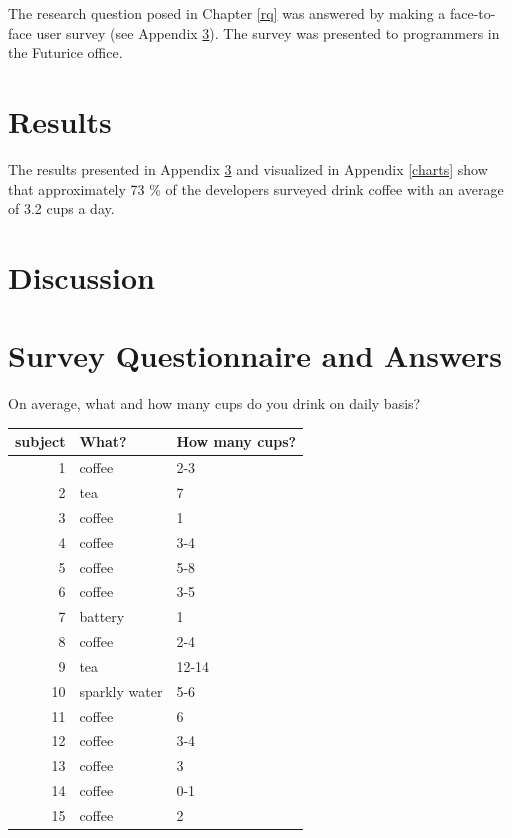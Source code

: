 \documentclass[a4paper,12pt]{article}
\begin{document}
The research question posed in Chapter \ref{rq} was answered by making
a face-to-face user survey (see Appendix \ref{survey}). The survey was
presented to programmers in the Futurice office.

\section{Results}

The results presented in Appendix \ref{survey} and visualized in
Appendix \ref{charts} show that approximately 73 \% of the developers
surveyed drink coffee with an average of 3.2 cups a day.

\section{Discussion}




\clearpage
\appendix
\section{Survey Questionnaire and Answers}
\label{survey}

On average, what and how many cups do you drink on daily basis?\\

\begin{tabular}{|r|l|l|}
  \hline
  \textbf{subject} & \textbf{What?} & \textbf{How many cups?} \\
  \hline
  1 & coffee & 2-3 \\
  2 & tea & 7 \\
  3 & coffee & 1 \\
  4 & coffee & 3-4 \\
  5 & coffee & 5-8 \\
  6 & coffee & 3-5 \\
  7 & battery & 1 \\
  8 & coffee & 2-4 \\
  9 & tea & 12-14 \\
  10 & sparkly water & 5-6 \\
  11 & coffee & 6 \\
  12 & coffee & 3-4 \\
  13 & coffee & 3 \\
  14 & coffee & 0-1 \\
  15 & coffee & 2 \\
  \hline
\end{tabular}
\end{document}
